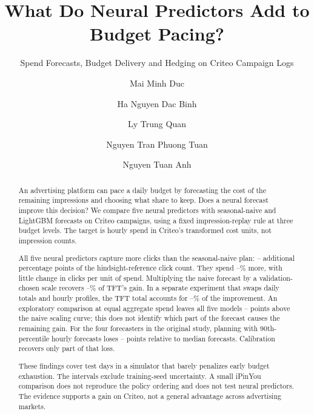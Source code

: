 \documentclass[sigconf,nonacm]{acmart}
\begin{document}
\title{What Do Neural Predictors Add to Budget Pacing?}
\subtitle{Spend Forecasts, Budget Delivery and Hedging on Criteo Campaign Logs}

\author{Mai Minh Duc}

\author{Ha Nguyen Dac Binh}

\author{Ly Trung Quan}

\author{Nguyen Tran Phuong Tuan}

\author{Nguyen Tuan Anh}

\begin{abstract}
An advertising platform can pace a daily budget by forecasting the cost of the
remaining impressions and choosing what share to keep. Does a neural forecast
improve this decision? We compare five neural predictors with seasonal-naive and
LightGBM forecasts on  Criteo campaigns, using a fixed
impression-replay rule at three budget levels. The target is hourly spend in
Criteo's transformed cost units, not impression counts.

All five neural predictors capture more clicks than the seasonal-naive plan:
-- additional percentage points of the
hindsight-reference click count. They spend --\%
more, with little change in clicks per unit of spend. Multiplying the naive
forecast by a validation-chosen scale recovers --\%
of TFT's gain. In a separate experiment that swaps daily totals and hourly
profiles, the TFT total accounts for --\%
of the improvement. An exploratory comparison at equal aggregate spend leaves
all five models -- points above the naive
scaling curve; this does not identify which part of the forecast causes the
remaining gain. For the four forecasters in the original study, planning with
90th-percentile hourly forecasts loses --
points relative to median forecasts. Calibration recovers only part of that loss.

These findings cover  test days in a simulator that barely
penalizes early budget exhaustion. The intervals exclude training-seed
uncertainty. A small iPinYou comparison does not reproduce the policy ordering
and does not test neural predictors. The evidence supports a gain on Criteo,
not a general advantage across advertising markets.
\end{abstract}
\end{document}
